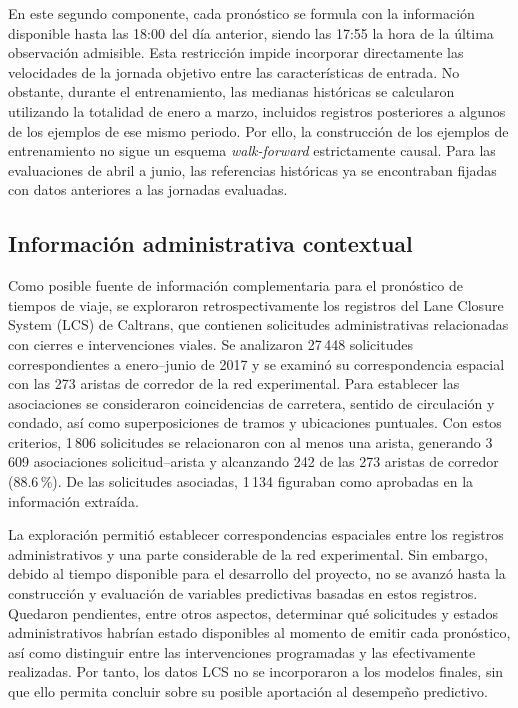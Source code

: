 \documentclass[letterpaper,11pt]{article}
\begin{document}
En este segundo componente, cada pronóstico se formula con la información disponible hasta las 18:00 del día anterior, siendo las 17:55 la hora de la última observación admisible. Esta restricción impide incorporar directamente las velocidades de la jornada objetivo entre las características de entrada. No obstante, durante el entrenamiento, las medianas históricas se calcularon utilizando la totalidad de enero a marzo, incluidos registros posteriores a algunos de los ejemplos de ese mismo periodo. Por ello, la construcción de los ejemplos de entrenamiento no sigue un esquema \emph{walk-forward} estrictamente causal. Para las evaluaciones de abril a junio, las referencias históricas ya se encontraban fijadas con datos anteriores a las jornadas evaluadas.

\subsection{Información administrativa contextual}
Como posible fuente de información complementaria para el pronóstico de tiempos de viaje, se exploraron retrospectivamente los registros del Lane Closure System (LCS) de Caltrans, que contienen solicitudes administrativas relacionadas con cierres e intervenciones viales. Se analizaron 27\,448 solicitudes correspondientes a enero--junio de 2017 y se examinó su correspondencia espacial con las 273 aristas de corredor de la red experimental. Para establecer las asociaciones se consideraron coincidencias de carretera, sentido de circulación y condado, así como superposiciones de tramos y ubicaciones puntuales. Con estos criterios, 1\,806 solicitudes se relacionaron con al menos una arista, generando 3\,609 asociaciones solicitud--arista y alcanzando 242 de las 273 aristas de corredor (88.6\,\%). De las solicitudes asociadas, 1\,134 figuraban como aprobadas en la información extraída.

La exploración permitió establecer correspondencias espaciales entre los registros administrativos y una parte considerable de la red experimental. Sin embargo, debido al tiempo disponible para el desarrollo del proyecto, no se avanzó hasta la construcción y evaluación de variables predictivas basadas en estos registros. Quedaron pendientes, entre otros aspectos, determinar qué solicitudes y estados administrativos habrían estado disponibles al momento de emitir cada pronóstico, así como distinguir entre las intervenciones programadas y las efectivamente realizadas. Por tanto, los datos LCS no se incorporaron a los modelos finales, sin que ello permita concluir sobre su posible aportación al desempeño predictivo.
\end{document}
